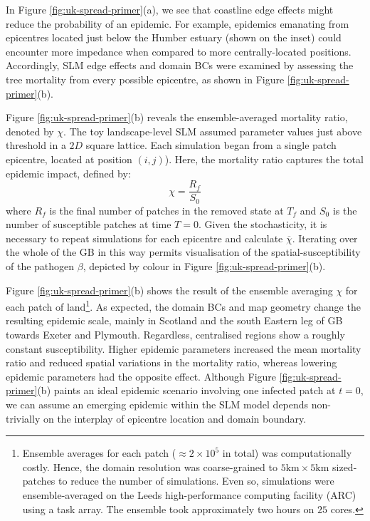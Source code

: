 In Figure \ref{fig:uk-spread-primer}(a), we see that coastline edge effects
might reduce the probability of an epidemic.
For example, epidemics emanating from epicentres located just below the 
Humber estuary (shown on the inset) could encounter more impedance when 
compared to more centrally-located positions.
Accordingly, SLM edge effects and domain BCs were examined by assessing the 
tree mortality from every possible epicentre, as shown in Figure \ref{fig:uk-spread-primer}(b).

Figure \ref{fig:uk-spread-primer}(b) reveals the ensemble-averaged mortality 
ratio, denoted by $\chi$.
The toy landscape-level SLM assumed parameter values just above threshold in a $2D$ square lattice. 
Each simulation began from a single patch epicentre, located at position $(i, j)$).
Here, the mortality ratio captures the total epidemic impact, defined by: 
\begin{equation}
\label{eq:epi_impact}
    \chi=\frac{R_f}{S_0}
\end{equation}
where $R_f$ is the final number of patches in the removed state at $T_f$ and $S_0$ is the number of susceptible 
patches at time $T=0$.
Given the stochasticity, it is necessary to repeat simulations for each epicentre 
and calculate $\overline{\chi}$. Iterating over the whole of the GB in this way permits visualisation
of the spatial-susceptibility of the pathogen $\beta$, depicted by colour in Figure \ref{fig:uk-spread-primer}(b).

Figure \ref{fig:uk-spread-primer}(b) shows the result of the ensemble averaging $\chi$ for each
patch of land\footnote{Ensemble averages for each patch ($\approx 2 \times 10^5$ in total) was computationally costly. 
Hence, the domain resolution was coarse-grained to $\mathrm{5km \times 5km}$ sized-patches to reduce the number of simulations.
Even so, simulations were ensemble-averaged on the Leeds high-performance computing facility (ARC) using a task array.
The ensemble took approximately two hours on $25$ cores.}.
As expected, the domain BCs and map geometry change the resulting epidemic scale, 
mainly in Scotland and the south Eastern leg of GB towards Exeter and Plymouth.
Regardless, centralised regions show a roughly constant susceptibility. 
Higher epidemic parameters increased the mean mortality ratio and reduced spatial variations in the mortality ratio, whereas lowering epidemic parameters had the opposite effect.
Although Figure \ref{fig:uk-spread-primer}(b) paints an ideal epidemic scenario involving one infected patch at $t=0$,
we can assume an emerging epidemic within the SLM model depends non-trivially on the interplay of epicentre location and domain boundary.
 
